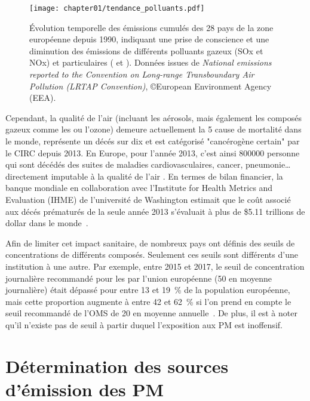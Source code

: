 \begin{figure}[ht]
    \centering
    \texttt{[image: chapter01/tendance\_polluants.pdf]}
    \caption{Évolution temporelle des émissions cumulés des 28 pays de la zone européenne
    depuis 1990, indiquant une prise de conscience et une diminution des émissions de
différents polluants gazeux (SOx et NOx) et particulaires (\PMdix{} et \PMdc). Données
issues de \textit{National emissions reported to the Convention on Long-range
Transboundary Air Pollution (LRTAP Convention)}, ©European Environment Agency (EEA).}%
\label{fig:chapter01/tendance_polluants}
\end{figure}


Cependant, la qualité de l'air (incluant les aérosols, mais également les
composés gazeux comme les  ou l'ozone) demeure actuellement la 5\ieme{} cause de
mortalité dans le monde, représente un décés sur dix et est catégorisé "cancérogène
certain" par le CIRC depuis 2013. En Europe, pour l'année 2013, c'est
ainsi \num{800000} personne qui sont décédés des suites de maladies cardiovasculaires,
cancer, pneumonie… directement imputable à la qualité de l'air
\autocite{worldhealthorganizationAmbient2016}.
En termes de bilan financier, la banque mondiale en collaboration avec l'Institute for
Health Metrics and Evaluation (IHME) de l'université de Washington estimait que le coût
associé aux décés prématurés de la seule année 2013 s'évaluait à plus de \$5.11 trillions
de dollar dans le monde~\autocite{worldbankCost2016}.

Afin de limiter cet impact sanitaire, de nombreux pays ont définis des seuils de
concentrations de différents composés. Seulement ces seuils sont différents d'une
institution à une autre. Par exemple, entre 2015 et 2017, le seuil de concentration
journalière recommandé pour les \PMdix{} par l'union européenne (\SI{50}{\ugm} en moyenne
journalière) était dépassé pour entre 13 et 19~\% de la population européenne, mais cette
proportion augmente à entre 42 et 62~\% si l'on prend en compte le seuil recommandé de
l'OMS de \SI{20}{\ugm} en moyenne annuelle~\autocite{europeanenvironmentagencyAir2019}.
De plus, il est à noter qu'il n'existe pas de seuil à partir duquel l'exposition aux PM
est inoffensif.

\section{Détermination des sources d'émission des PM}%
\label{sec:source_apportionment_of_pm}

